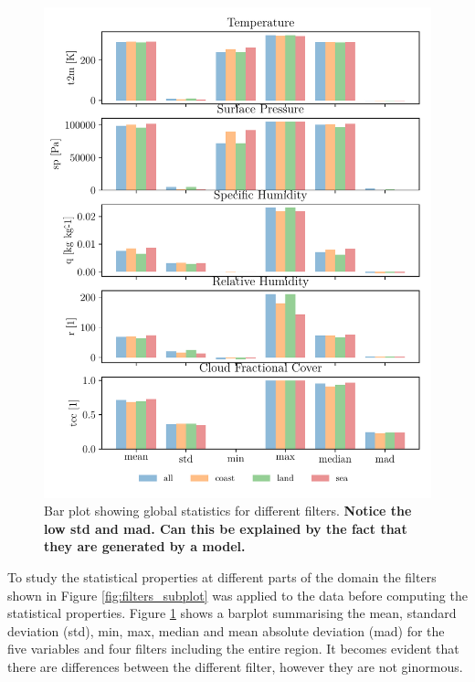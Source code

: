 \begin{figure}[ht]
    \centering
    \includegraphics{python_figs/bar_plot_global_statistics_new_legend.pdf}
    \caption{Bar plot showing global statistics for different filters. \textbf{Notice the low std and mad. Can this be explained by the fact that they are generated by a model.}}
    \label{fig:bar_plot_global_stats}
\end{figure}
To study the statistical properties at different parts of the domain the filters shown in Figure \ref{fig:filters_subplot} was applied to the data before computing the statistical properties. Figure \ref{fig:bar_plot_global_stats} shows a barplot summarising the mean, standard deviation (std), min, max, median and mean absolute deviation (mad) for the five variables and four filters including the entire region. It becomes evident that there are differences between the different filter, however they are not ginormous.

